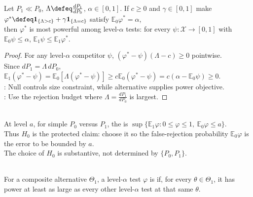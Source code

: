 \begin{theorem} \label{thm:neyman-pearson-lemma} \\
Let $P_1\ll P_0$, $\Lambda\defeq \frac{dP_1}{dP_0}$, $\alpha\in[0,1]$. If $c\geq0$ and $\gamma\in[0,1]$ make $\varphi^\ast\defeq\mathbf{1}_{\{\Lambda>c\}}+\gamma\mathbf{1}_{\{\Lambda=c\}}$ satisfy $\mathbb{E}_0\varphi^\ast=\alpha$,\\
then $\varphi^\ast$ is most powerful among level-$\alpha$ tests: for every $\psi:\mathcal{X}\to[0,1]$ with $\mathbb{E}_0\psi\leq\alpha$, $\mathbb{E}_1\psi\leq\mathbb{E}_1\varphi^\ast$.
\begin{proof}
For any level-$\alpha$ competitor $\psi$, $(\varphi^\ast-\psi)(\Lambda-c)\geq0$ pointwise.\\
Since $dP_1=\Lambda\,dP_0$, $\mathbb{E}_1(\varphi^\ast-\psi)=\mathbb{E}_0[\Lambda(\varphi^\ast-\psi)]\geq c\mathbb{E}_0(\varphi^\ast-\psi)=c(\alpha-\mathbb{E}_0\psi)\geq0$.\\
: Null controls size constraint, while alternative supplies power objective.\\
: Use the rejection budget where $\Lambda=\frac{dP_1}{dP_0}$ is largest.
\end{proof}
\end{theorem}

\begin{remark} \label{rem:null-alternative-asymmetry} \\
At level $a$, for simple $P_0$ versus $P_1$, the  is $\sup\{\mathbb{E}_1\varphi:0\leq\varphi\leq1,\ \mathbb{E}_0\varphi\leq a\}$.\\
Thus $H_0$ is the protected claim: choose it so the false-rejection probability $\mathbb{E}_0\varphi$ is the error to be bounded by $a$.\\
The choice of $H_0$ is substantive, not determined by $\{P_0,P_1\}$.
\end{remark}

\begin{definition} \label{def:uniformly-most-powerful-test} \\
For a composite alternative $\Theta_1$, a level-$\alpha$ test $\varphi$ is  if, for every $\theta\in\Theta_1$, it has power at least as large as every other level-$\alpha$ test at that same $\theta$.
\end{definition}

